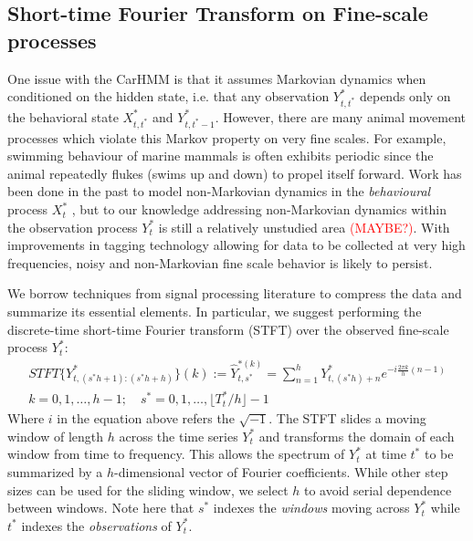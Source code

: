 

\subsection{Short-time Fourier Transform on Fine-scale processes}

One issue with the CarHMM is that it assumes Markovian dynamics when conditioned on the hidden state, i.e. that any observation $Y^*_{t,t^*}$ depends only on the behavioral state $X^*_{t,t^*}$ and $Y^*_{t,t^*-1}$. However, there are many animal movement processes which violate this Markov property on very fine scales. For example, swimming behaviour of marine mammals is often exhibits periodic since the animal repeatedly flukes (swims up and down) to propel itself forward. Work has been done in the past to model non-Markovian dynamics in the \textit{behavioural} process $X^*_t$ \cite{Langrock:2012}, but to our knowledge addressing non-Markovian dynamics within the observation process $Y^*_t$ is still a relatively unstudied area \textcolor{red}{(MAYBE?)}. With improvements in tagging technology allowing for data to be collected at very high frequencies, noisy and non-Markovian fine scale behavior is likely to persist.

We borrow techniques from signal processing literature to compress the data and summarize its essential elements. In particular, we suggest performing the discrete-time short-time Fourier transform (STFT) over the observed fine-scale process $Y^*_t$:
%
\begin{align*}
    STFT\{Y^*_{t,(s^*h+1):(s^*h+h) }\}(k) := \hat{Y}^{*(k)}_{t,s^*} = \sum_{n = 1}^{h} Y^*_{t,(s^*h)+n}e^{-i \frac{2\pi k}{h} (n-1)} \\ k = 0, 1, \ldots, h-1; \quad s^* = 0,1, \ldots, \lfloor T^*_t / h \rfloor - 1
\end{align*}
%
Where $i$ in the equation above refers the $\sqrt{-1}$. The STFT slides a moving window of length $h$ across the time series $Y_t^*$ and transforms the domain of each window from time to frequency. This allows the spectrum of $Y_t^*$ at time $t^*$ to be summarized by a $h$-dimensional vector of Fourier coefficients. While other step sizes can be used for the sliding window, we select $h$ to avoid serial dependence between windows. Note here that $s^*$ indexes the \textit{windows} moving across $Y^*_t$ while $t^*$ indexes the \textit{observations} of $Y^*_t$. 

